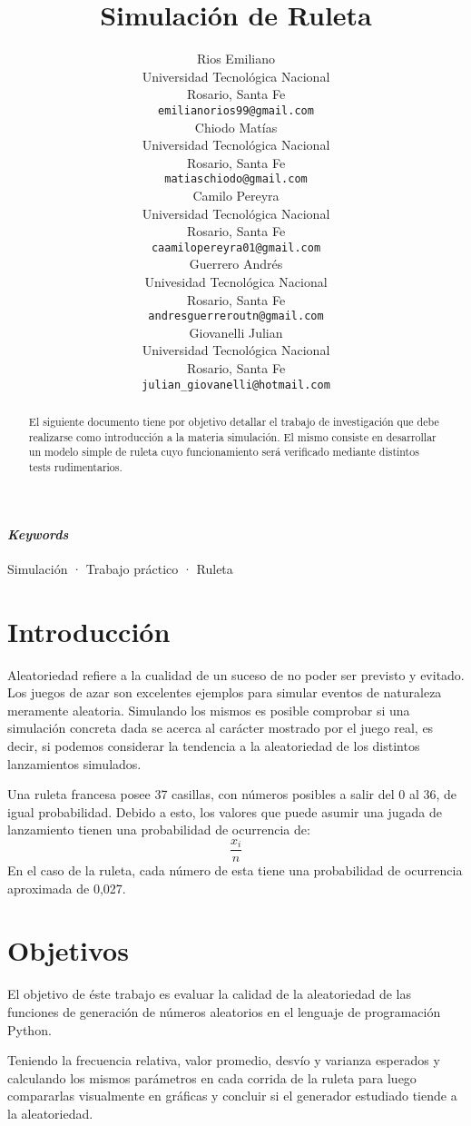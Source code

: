 \documentclass{article}
\title{Simulación de Ruleta}
\author{
  Rios Emiliano\\
  Universidad Tecnológica Nacional\\
  Rosario, Santa Fe  \\
  \texttt{emilianorios99@gmail.com} \\
  \And
  Chiodo Matías\\
  Universidad Tecnológica Nacional\\
  Rosario, Santa Fe  \\
  \texttt{matiaschiodo@gmail.com} \\
  \And
  Camilo Pereyra\\
  Universidad Tecnológica Nacional\\
  Rosario, Santa Fe\\
  \texttt{caamilopereyra01@gmail.com} \\
  \And
  Guerrero Andrés\\
  Univesidad Tecnológica Nacional\\
  Rosario, Santa Fe \\
  \texttt {andresguerreroutn@gmail.com} \\
  \And
  Giovanelli Julian\\
  Universidad Tecnológica Nacional\\
  Rosario, Santa Fe  \\
  \texttt{julian\_giovanelli@hotmail.com} \\
}
\begin{document}
\maketitle
\begin{abstract}
El siguiente documento tiene por objetivo detallar el trabajo de investigación que debe realizarse
como introducción a la materia simulación. El mismo consiste en desarrollar un modelo simple de
ruleta cuyo funcionamiento será verificado mediante distintos tests rudimentarios.
\end{abstract}

\paragraph{\textit{Keywords}} Simulación · Trabajo práctico · Ruleta

\section{Introducción}
Aleatoriedad refiere a la cualidad de un suceso de no poder ser previsto y evitado. Los juegos de azar son excelentes ejemplos para simular eventos de naturaleza meramente aleatoria. Simulando los mismos es posible comprobar si una simulación concreta dada se acerca al carácter mostrado por el juego real, es decir, si podemos considerar la tendencia a la aleatoriedad de los distintos lanzamientos simulados.

Una ruleta francesa posee 37 casillas, con números posibles a salir del 0 al 36, de igual probabilidad. Debido a esto, los valores que puede asumir una jugada de lanzamiento tienen una probabilidad de ocurrencia de: \begin{equation} \frac{x_i}{n} \end{equation} En el caso de la ruleta, cada número de esta tiene una probabilidad de ocurrencia aproximada de 0,027.

\section{Objetivos}
El objetivo de éste trabajo es evaluar la calidad de la aleatoriedad de las funciones de generación de números aleatorios en el lenguaje de programación Python. 

Teniendo la frecuencia relativa, valor promedio, desvío y varianza esperados y calculando los mismos parámetros en cada corrida de la ruleta para luego compararlas visualmente en gráficas y concluir si el generador estudiado tiende a la aleatoriedad.
\end{document}
